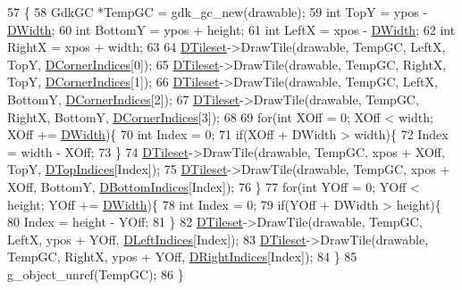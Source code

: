 \begin{DoxyCode}
57                                                                                           \{
58     GdkGC *TempGC = gdk\_gc\_new(drawable);
59     \textcolor{keywordtype}{int} TopY = ypos - \hyperlink{classCBevel_a891dccc1828c48e5e7a475ca33080060}{DWidth};
60     \textcolor{keywordtype}{int} BottomY = ypos + height;
61     \textcolor{keywordtype}{int} LeftX = xpos - \hyperlink{classCBevel_a891dccc1828c48e5e7a475ca33080060}{DWidth};
62     \textcolor{keywordtype}{int} RightX = xpos + width;
63     
64     \hyperlink{classCBevel_a98cbd98b79bc8cffd408f12fee447fb9}{DTileset}->DrawTile(drawable, TempGC, LeftX, TopY, \hyperlink{classCBevel_ab5e1c6e9de178bdfbdb87796945a289e}{DCornerIndices}[0]);
65     \hyperlink{classCBevel_a98cbd98b79bc8cffd408f12fee447fb9}{DTileset}->DrawTile(drawable, TempGC, RightX, TopY, \hyperlink{classCBevel_ab5e1c6e9de178bdfbdb87796945a289e}{DCornerIndices}[1]);
66     \hyperlink{classCBevel_a98cbd98b79bc8cffd408f12fee447fb9}{DTileset}->DrawTile(drawable, TempGC, LeftX, BottomY, \hyperlink{classCBevel_ab5e1c6e9de178bdfbdb87796945a289e}{DCornerIndices}[2]);
67     \hyperlink{classCBevel_a98cbd98b79bc8cffd408f12fee447fb9}{DTileset}->DrawTile(drawable, TempGC, RightX, BottomY, \hyperlink{classCBevel_ab5e1c6e9de178bdfbdb87796945a289e}{DCornerIndices}[3]);
68     
69     \textcolor{keywordflow}{for}(\textcolor{keywordtype}{int} XOff = 0; XOff < width; XOff += \hyperlink{classCBevel_a891dccc1828c48e5e7a475ca33080060}{DWidth})\{
70         \textcolor{keywordtype}{int} Index = 0;
71         \textcolor{keywordflow}{if}(XOff + DWidth > width)\{
72             Index = width - XOff;
73         \}
74         \hyperlink{classCBevel_a98cbd98b79bc8cffd408f12fee447fb9}{DTileset}->DrawTile(drawable, TempGC, xpos + XOff, TopY, 
      \hyperlink{classCBevel_a05e4406edf5927df6431f103f7207a1b}{DTopIndices}[Index]);
75         \hyperlink{classCBevel_a98cbd98b79bc8cffd408f12fee447fb9}{DTileset}->DrawTile(drawable, TempGC, xpos + XOff, BottomY, 
      \hyperlink{classCBevel_a1593dec2a677674416284cba85516d5a}{DBottomIndices}[Index]);
76     \}
77     \textcolor{keywordflow}{for}(\textcolor{keywordtype}{int} YOff = 0; YOff < height; YOff += \hyperlink{classCBevel_a891dccc1828c48e5e7a475ca33080060}{DWidth})\{
78         \textcolor{keywordtype}{int} Index = 0;
79         \textcolor{keywordflow}{if}(YOff + DWidth > height)\{
80             Index = height - YOff;
81         \}
82         \hyperlink{classCBevel_a98cbd98b79bc8cffd408f12fee447fb9}{DTileset}->DrawTile(drawable, TempGC, LeftX, ypos + YOff, 
      \hyperlink{classCBevel_a8ae622f8be35f17dbb6e492864bae9ce}{DLeftIndices}[Index]);
83         \hyperlink{classCBevel_a98cbd98b79bc8cffd408f12fee447fb9}{DTileset}->DrawTile(drawable, TempGC, RightX, ypos + YOff, 
      \hyperlink{classCBevel_a52160856e5fbb45c4c1d6e433089ab05}{DRightIndices}[Index]);
84     \}
85     g\_object\_unref(TempGC);   
86 \}
\end{DoxyCode}
